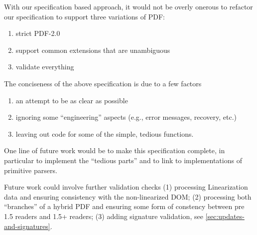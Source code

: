 With our specification based approach, it would not be overly onerous
to refactor our specification to support three variations of PDF:
\begin{enumerate}
\item strict PDF-2.0
\item support common extensions that are unambiguous
\item validate everything
\end{enumerate}

The conciseness of the above specification is due to a few factors
\begin{enumerate}
\item an attempt to be as clear as possible
\item ignoring some ``engineering'' aspects (e.g., error
   messages, recovery, etc.)
\item leaving out code for some of the simple, tedious functions.
\end{enumerate}
One line of future work would be to make this specification complete,
in particular to implement the ``tedious parts'' and to link to
implementations of primitive parsers.

Future work could involve further validation checks
(1) processing Linearization data and ensuring consistency with the
non-linearized DOM;
(2) processing both ``branches'' of a hybrid PDF and ensuring
some form of constency between pre 1.5 readers and 1.5+ readers;
(3) adding signature validation, see \cref{sec:updates-and-signatures}.
